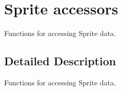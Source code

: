 \hypertarget{group____sprite__accessors}{\section{Sprite accessors}
\label{group____sprite__accessors}
}


Functions for accessing Sprite data.  




\subsection{Detailed Description}
Functions for accessing Sprite data. 